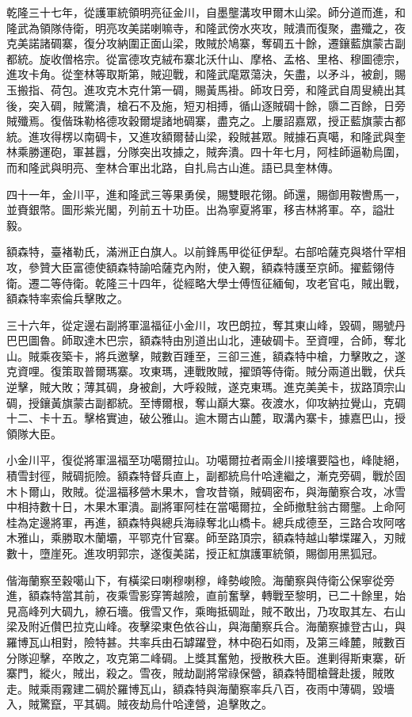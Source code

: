 \begin{pinyinscope}
乾隆三十七年，從護軍統領明亮征金川，自墨壟溝攻甲爾木山梁。師分道而進，和隆武為領隊侍衛，明亮攻美諾喇嘛寺，和隆武傍水夾攻，賊潰而復聚，盡殲之，夜克美諾諸碉寨，復分攻納圍正面山梁，敗賊於鳩寨，奪碉五十餘，遷鑲藍旗蒙古副都統。旋收僧格宗。從富德攻克絨布寨北沃什山、摩格、孟格、里格、穆圖德宗，進攻卡角。從奎林等取斯第，賊迎戰，和隆武麾眾蕩決，矢盡，以矛斗，被創，賜玉搬指、荷包。進攻克木克什第一碉，賜黃馬褂。師攻日旁，和隆武自周叟繞出其後，突入碉，賊驚潰，槍石不及施，短刃相搏，循山逐賊碉十餘，隳二百餘，日旁賊殲焉。復偕珠勒格德攻穀爾堤諸地碉寨，盡克之。上屢詔嘉眾，授正藍旗蒙古都統。進攻得楞以南碉卡，又進攻額爾替山梁，殺賊甚眾。賊據石真噶，和隆武與奎林乘勝運砲，軍甚囂，分隊突出攻據之，賊奔潰。四十年七月，阿桂師逼勒烏圍，而和隆武與明亮、奎林合軍出北路，自扎烏古山進。語已具奎林傳。

四十一年，金川平，進和隆武三等果勇侯，賜雙眼花翎。師還，賜御用鞍轡馬一，並賚銀幣。圖形紫光閣，列前五十功臣。出為寧夏將軍，移吉林將軍。卒，謚壯毅。

額森特，臺褚勒氏，滿洲正白旗人。以前鋒馬甲從征伊犁。右部哈薩克與塔什罕相攻，參贊大臣富德使額森特諭哈薩克內附，使入覲，額森特護至京師。擢藍翎侍衛。遷二等侍衛。乾隆三十四年，從經略大學士傅恆征緬甸，攻老官屯，賊出戰，額森特率索倫兵擊敗之。

三十六年，從定邊右副將軍溫福征小金川，攻巴朗拉，奪其東山峰，毀碉，賜號丹巴巴圖魯。師取達木巴宗，額森特由別道出山北，連破碉卡。至資哩，合師，奪北山。賊乘夜築卡，將兵邀擊，賊數百踵至，三卻三進，額森特中槍，力擊敗之，遂克資哩。復策取普爾瑪寨。攻東瑪，連戰敗賊，擢頭等侍衛。賊分兩道出戰，伏兵逆擊，賊大敗；薄其碉，身被創，大呼殺賊，遂克東瑪。進克美美卡，拔路頂宗山碉，授鑲黃旗蒙古副都統。至博爾根，奪山巔大寨。夜渡水，仰攻納拉覺山，克碉十二、卡十五。擊格實迪，破公雅山。逾木爾古山麓，取溝內寨卡，據嘉巴山，授領隊大臣。

小金川平，復從將軍溫福至功噶爾拉山。功噶爾拉者兩金川接壤要隘也，峰陡絕，積雪封徑，賊碉扼險。額森特督兵直上，副都統烏什哈達繼之，漸克旁碉，戰於固木卜爾山，敗賊。從溫福移營木果木，會攻昔嶺，賊碉密布，與海蘭察合攻，冰雪中相持數十日，木果木軍潰。副將軍阿桂在當噶爾拉，全師撤駐翁古爾壟。上命阿桂為定邊將軍，再進，額森特與總兵海祿奪北山橋卡。總兵成德至，三路合攻阿喀木雅山，乘勝取木蘭壩，平鄂克什官寨。師至路頂宗，額森特越山攀堞躍入，刃賊數十，墮崖死。進攻明郭宗，遂復美諾，授正紅旗護軍統領，賜御用黑狐冠。

偕海蘭察至穀噶山下，有橫梁曰喇穆喇穆，峰勢峻險。海蘭察與侍衛公保寧從旁進，額森特當其前，夜乘雪影穿箐越險，直前奮擊，轉戰至黎明，已二十餘里，始見高峰列大碉九，繚石墻。俄雪又作，乘晦抵碉趾，賊不敢出，乃攻取其左、右山梁及附近儹巴拉克山峰。夜擊梁東色依谷山，與海蘭察兵合。海蘭察據登古山，與羅博瓦山相對，險特甚。共率兵由石罅躍登，林中砲石如雨，及第三峰麓，賊數百分隊迎擊，卒敗之，攻克第二峰碉。上獎其奮勉，授散秩大臣。進剿得斯東寨，斫寨門，縱火，賊出，殺之。雪夜，賊劫副將常祿保營，額森特聞槍聲赴援，賊敗走。賊乘雨霧建二碉於羅博瓦山，額森特與海蘭察率兵八百，夜雨中薄碉，毀墻入，賊驚竄，平其碉。賊夜劫烏什哈達營，追擊敗之。


\end{pinyinscope}

